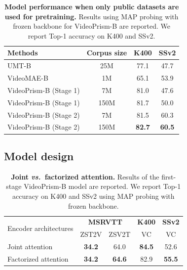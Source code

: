 \documentclass{article}
\theoremstyle{plain}
\theoremstyle{definition}
\theoremstyle{remark}
\newcommand{\OURS}{VideoPrism\xspace}
\begin{document}
\begin{table}[t]
    \caption{\textbf{Model performance when only public datasets are used for pretraining.} Results using MAP probing with frozen backbone for \OURS-B are reported. We report Top-1 accuracy on K400 and SSv2.}
	\vskip 0.1in
	\begin{center}
	\begin{scriptsize}
\begin{tabular}	{lccc}
			\toprule
			Methods & Corpus size & \textbf{K400} & \textbf{SSv2} \\
			\midrule
    UMT-B~\cite{li2023unmasked} & 25M & 77.1 & 47.7 \\
    VideoMAE-B~\cite{tong2022videomae} & 1M & 65.1 & 53.9 \\
    \midrule
    \OURS-B (Stage 1) & 7M & 81.0 & 47.6 \\
    \OURS-B (Stage 1) & 150M & 81.7 & 50.0 \\
    \OURS-B (Stage 2) & 7M & 81.5 & 60.3 \\
    \OURS-B (Stage 2) & 150M & \textbf{82.7} & \textbf{60.5} \\
		\bottomrule
		\end{tabular}
\end{scriptsize}
	\end{center}
	\vskip -0.1in
\label{tab:public_data}
\end{table}


\subsection{Model design}

\begin{table}[t]
    \caption{\textbf{Joint \textit{vs.}\ factorized attention.} Results of the first-stage \OURS-B model are reported. We report Top-1 accuracy on K400 and SSv2 using MAP probing with frozen backbone.}
	\label{tab:factorized}
	\vskip 0.1in
	\begin{center}
\begin{scriptsize}
		\begin{tabular}	{lcccc}
			\toprule
			\multirow{2}{*}{Encoder architectures} & \multicolumn{2}{c}{\textbf{MSRVTT}} & \textbf{K400} & \textbf{SSv2} \\
			& ZST2V & ZSV2T & VC & VC \\
			\midrule
    Joint attention & \textbf{34.2} & 64.0 & \textbf{84.5} & 52.6 \\
    Factorized attention & \textbf{34.2} & \textbf{64.6} & 82.9 & \textbf{55.5} \\
		\bottomrule
		\end{tabular}
	\end{scriptsize}
	\end{center}
	\vskip -0.1in
\end{table}
\end{document}
